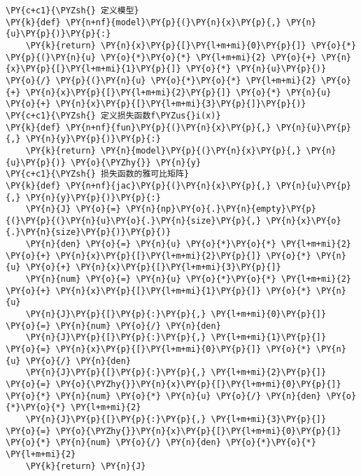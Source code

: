     \begin{tcolorbox}[breakable, size=fbox, boxrule=1pt, pad at break*=1mm,colback=cellbackground, colframe=cellborder]
\begin{Verbatim}[commandchars=\\\{\}]
\PY{c+c1}{\PYZsh{} 定义模型}
\PY{k}{def} \PY{n+nf}{model}\PY{p}{(}\PY{n}{x}\PY{p}{,} \PY{n}{u}\PY{p}{)}\PY{p}{:}
    \PY{k}{return} \PY{n}{x}\PY{p}{[}\PY{l+m+mi}{0}\PY{p}{]} \PY{o}{*} \PY{p}{(}\PY{n}{u} \PY{o}{*}\PY{o}{*} \PY{l+m+mi}{2} \PY{o}{+} \PY{n}{x}\PY{p}{[}\PY{l+m+mi}{1}\PY{p}{]} \PY{o}{*} \PY{n}{u}\PY{p}{)} \PY{o}{/} \PY{p}{(}\PY{n}{u} \PY{o}{*}\PY{o}{*} \PY{l+m+mi}{2} \PY{o}{+} \PY{n}{x}\PY{p}{[}\PY{l+m+mi}{2}\PY{p}{]} \PY{o}{*} \PY{n}{u} \PY{o}{+} \PY{n}{x}\PY{p}{[}\PY{l+m+mi}{3}\PY{p}{]}\PY{p}{)}
\PY{c+c1}{\PYZsh{} 定义损失函数f\PYZus{}i(x)}
\PY{k}{def} \PY{n+nf}{fun}\PY{p}{(}\PY{n}{x}\PY{p}{,} \PY{n}{u}\PY{p}{,} \PY{n}{y}\PY{p}{)}\PY{p}{:}
    \PY{k}{return} \PY{n}{model}\PY{p}{(}\PY{n}{x}\PY{p}{,} \PY{n}{u}\PY{p}{)} \PY{o}{\PYZhy{}} \PY{n}{y}
\PY{c+c1}{\PYZsh{} 损失函数的雅可比矩阵}
\PY{k}{def} \PY{n+nf}{jac}\PY{p}{(}\PY{n}{x}\PY{p}{,} \PY{n}{u}\PY{p}{,} \PY{n}{y}\PY{p}{)}\PY{p}{:}
    \PY{n}{J} \PY{o}{=} \PY{n}{np}\PY{o}{.}\PY{n}{empty}\PY{p}{(}\PY{p}{(}\PY{n}{u}\PY{o}{.}\PY{n}{size}\PY{p}{,} \PY{n}{x}\PY{o}{.}\PY{n}{size}\PY{p}{)}\PY{p}{)}
    \PY{n}{den} \PY{o}{=} \PY{n}{u} \PY{o}{*}\PY{o}{*} \PY{l+m+mi}{2} \PY{o}{+} \PY{n}{x}\PY{p}{[}\PY{l+m+mi}{2}\PY{p}{]} \PY{o}{*} \PY{n}{u} \PY{o}{+} \PY{n}{x}\PY{p}{[}\PY{l+m+mi}{3}\PY{p}{]}
    \PY{n}{num} \PY{o}{=} \PY{n}{u} \PY{o}{*}\PY{o}{*} \PY{l+m+mi}{2} \PY{o}{+} \PY{n}{x}\PY{p}{[}\PY{l+m+mi}{1}\PY{p}{]} \PY{o}{*} \PY{n}{u}
    \PY{n}{J}\PY{p}{[}\PY{p}{:}\PY{p}{,} \PY{l+m+mi}{0}\PY{p}{]} \PY{o}{=} \PY{n}{num} \PY{o}{/} \PY{n}{den}
    \PY{n}{J}\PY{p}{[}\PY{p}{:}\PY{p}{,} \PY{l+m+mi}{1}\PY{p}{]} \PY{o}{=} \PY{n}{x}\PY{p}{[}\PY{l+m+mi}{0}\PY{p}{]} \PY{o}{*} \PY{n}{u} \PY{o}{/} \PY{n}{den}
    \PY{n}{J}\PY{p}{[}\PY{p}{:}\PY{p}{,} \PY{l+m+mi}{2}\PY{p}{]} \PY{o}{=} \PY{o}{\PYZhy{}}\PY{n}{x}\PY{p}{[}\PY{l+m+mi}{0}\PY{p}{]} \PY{o}{*} \PY{n}{num} \PY{o}{*} \PY{n}{u} \PY{o}{/} \PY{n}{den} \PY{o}{*}\PY{o}{*} \PY{l+m+mi}{2}
    \PY{n}{J}\PY{p}{[}\PY{p}{:}\PY{p}{,} \PY{l+m+mi}{3}\PY{p}{]} \PY{o}{=} \PY{o}{\PYZhy{}}\PY{n}{x}\PY{p}{[}\PY{l+m+mi}{0}\PY{p}{]} \PY{o}{*} \PY{n}{num} \PY{o}{/} \PY{n}{den} \PY{o}{*}\PY{o}{*} \PY{l+m+mi}{2}
    \PY{k}{return} \PY{n}{J}
\end{Verbatim}
\end{tcolorbox}

